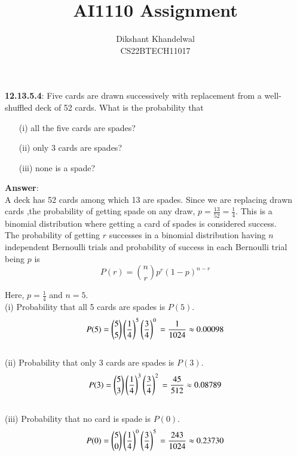 \documentclass[journal,12pt,twocolumn]{IEEEtran}
\title{AI1110 Assignment}
\author{Dikshant Khandelwal\\
		CS22BTECH11017}
\begin{document}
%

\maketitle

\textbf{12.13.5.4}: Five cards are drawn successively with replacement from a well-shuffled deck
of 52 cards. What is the probability that
\begin{enumerate}
    \item[(i)] all the five cards are spades?
    \item[(ii)] only 3 cards are spades?
    \item[(iii)] none is a spade?
\end{enumerate}

\noindent\textbf{Answer}:\\[8pt]
A deck has 52 cards among which 13 are spades. Since we are replacing drawn cards ,the probability of getting spade on any draw, $p = \frac{13}{52} = \frac{1}{4}$. This is a binomial distribution where getting a card of spades is considered success.\\[6pt]
The probability of getting $r$ successes in a binomial distribution having $n$ independent Bernoulli trials
and probability of success in each Bernoulli trial being $p$ is 
$$
P(r) =  \displaystyle\binom{n}{r} p^{r}(1-p)^{n-r}
$$

Here, $p = \displaystyle\frac{1}{4}$ and $n = 5$.\\[8pt]
(i) Probability that all 5 cards are spades is $P(5)$.
$$
P(5) = \binom{5}{5} \left(\frac{1}{4}\right)^{5} \left(\frac{3}{4}\right)^{0} \\
     = \frac{1}{1024}
     \approx 0.00098
$$\\
(ii) Probability that only 3 cards are spades is $P(3)$.
$$
P(3) = \binom{5}{3} \left(\frac{1}{4}\right)^{3} \left(\frac{3}{4}\right)^{2} \\
     = \frac{45}{512}
     \approx 0.08789
$$\\
(iii) Probability that no card is spade is $P(0)$.
$$
P(0) = \binom{5}{0} \left(\frac{1}{4}\right)^{0} \left(\frac{3}{4}\right)^{5} \\
     = \frac{243}{1024}
     \approx 0.23730
$$
\end{document}
